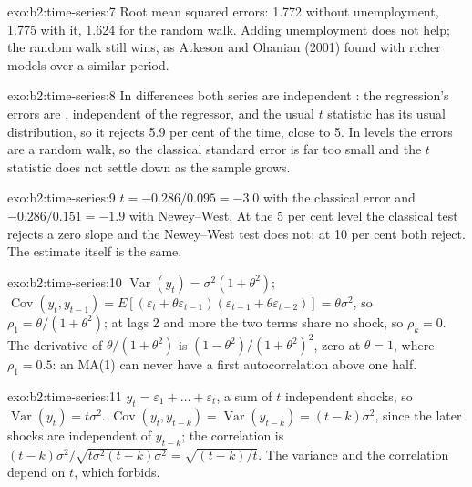 \begin{solution}{exo:b2:time-series:7}
Root mean squared errors: 1.772 without unemployment, 1.775 with it, 1.624 for the random walk. Adding unemployment does
not help; the random walk still wins, as Atkeson and Ohanian (2001) found with richer models over a similar period.
\end{solution}

\begin{solution}{exo:b2:time-series:8}
In differences both series are independent : the regression's errors are , independent of the
regressor, and the usual $t$ statistic has its usual distribution, so it rejects 5.9 per cent of the time, close to 5. In
levels the errors are a random walk, so the classical standard error is far too small and the $t$ statistic does not
settle down as the sample grows.
\end{solution}

\begin{solution}{exo:b2:time-series:9}
$t = -0.286/0.095 = -3.0$ with the classical error and $-0.286/0.151 = -1.9$ with Newey--West. At the 5 per cent level the
classical test rejects a zero slope and the Newey--West test does not; at 10 per cent both reject. The estimate itself is
the same.
\end{solution}

\begin{solution}{exo:b2:time-series:10}
$\operatorname{Var}(y_t) = \sigma^2(1 + \theta^2)$; $\operatorname{Cov}(y_t, y_{t-1}) = E[(\varepsilon_t +
\theta\varepsilon_{t-1})(\varepsilon_{t-1} + \theta\varepsilon_{t-2})] = \theta\sigma^2$, so $\rho_1 = \theta/(1 +
\theta^2)$; at lags 2 and more the two terms share no shock, so $\rho_k = 0$. The derivative of $\theta/(1 + \theta^2)$ is
$(1 - \theta^2)/(1 + \theta^2)^2$, zero at $\theta = 1$, where $\rho_1 = 0.5$: an MA(1) can never have a first
autocorrelation above one half.
\end{solution}

\begin{solution}{exo:b2:time-series:11}
$y_t = \varepsilon_1 + \dots + \varepsilon_t$, a sum of $t$ independent shocks, so $\operatorname{Var}(y_t) = t\sigma^2$.
$\operatorname{Cov}(y_t, y_{t-k}) = \operatorname{Var}(y_{t-k}) = (t - k)\sigma^2$, since the later shocks are independent
of $y_{t-k}$; the correlation is $(t - k)\sigma^2/\sqrt{t\sigma^2(t - k)\sigma^2} = \sqrt{(t - k)/t}$. The variance and the
correlation depend on $t$, which  forbids.
\end{solution}

